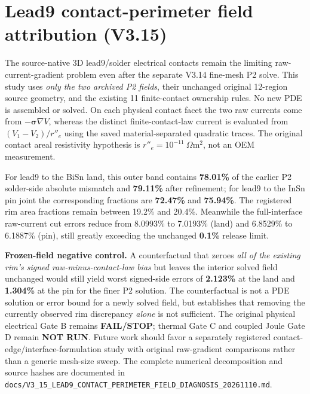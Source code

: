 \section{Lead9 contact-perimeter field attribution (V3.15)}
\label{sec:v315-perimeter}
The source-native 3D lead9/solder electrical contacts remain the limiting raw-current-gradient problem even after the separate V3.14 fine-mesh P2 solve. This study uses \emph{only the two archived P2 fields}, their unchanged original 12-region source geometry, and the existing 11 finite-contact ownership rules. No new PDE is assembled or solved. On each physical contact facet the two raw currents come from \(-\boldsymbol\sigma\nabla V\), whereas the distinct finite-contact-law current is evaluated from \((V_1-V_2)/r''_e\) using the saved material-separated quadratic traces. The original contact areal resistivity hypothesis is \(r''_e=10^{-11}\ \Omega\mathrm m^2\), not an OEM measurement.


For lead9 to the BiSn land, this outer band contains \textbf{78.01\%} of the earlier P2 solder-side absolute mismatch and \textbf{79.11\%} after refinement; for lead9 to the InSn pin joint the corresponding fractions are \textbf{72.47\%} and \textbf{75.94\%}. The registered rim area fractions remain between 19.2\% and 20.4\%. Meanwhile the full-interface raw-current cut errors reduce from 8.0993\% to 7.0193\% (land) and 6.8529\% to 6.1887\% (pin), still greatly exceeding the unchanged \textbf{0.1\%} release limit.

\textbf{Frozen-field negative control.} A counterfactual that zeroes \emph{all of the existing rim's signed raw-minus-contact-law bias} but leaves the interior solved field unchanged would still yield worst signed-side errors of \textbf{2.123\%} at the land and \textbf{1.304\%} at the pin for the finer P2 solution. The counterfactual is not a PDE solution or error bound for a newly solved field, but establishes that removing the currently observed rim discrepancy \emph{alone} is not sufficient. The original physical electrical Gate B remains \textbf{FAIL/STOP}; thermal Gate C and coupled Joule Gate D remain \textbf{NOT RUN}. Future work should favor a separately registered contact-edge/interface-formulation study with original raw-gradient comparisons rather than a generic mesh-size sweep. The complete numerical decomposition and source hashes are documented in \texttt{docs/V3\_15\_LEAD9\_CONTACT\_PERIMETER\_FIELD\_DIAGNOSIS\_20261110.md}.
